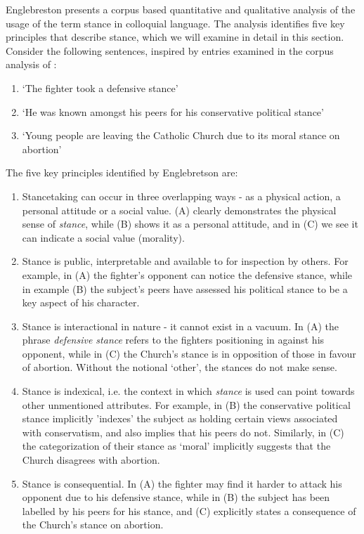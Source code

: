 \documentclass[Dissertation.tex]{subfiles}
\begin{document}
Englebreston \cite{englebretsonStancetakingDiscourseSubjectivity2007} presents a corpus based quantitative and qualitative analysis of the usage of the term stance in colloquial language. The analysis identifies five key principles that describe stance, which we will examine in detail in this section. Consider the following sentences, inspired by entries examined in the corpus analysis of \cite{englebretsonStancetakingDiscourseSubjectivity2007}:


\begin{enumerate}
	\renewcommand{\labelenumi}{(\Alph{enumi})}
	\item `The fighter took a defensive stance'
	\item `He was known amongst his peers for his conservative political stance'
	\item `Young people are leaving the Catholic Church due to its moral stance on abortion'
	\
\end{enumerate}

The five key principles identified by Englebretson \cite{englebretsonStancetakingDiscourseSubjectivity2007} are:
\begin{enumerate}
	\item Stancetaking can occur in three overlapping ways - as a physical action, a personal attitude or a social value. (A) clearly demonstrates the physical sense of \textit{stance}, while (B) shows it as a personal attitude, and in (C) we see it can indicate a social value (morality). 
	
	\item Stance is public, interpretable and available to for inspection by others. For example, in (A) the fighter's opponent can notice the defensive stance, while in example (B) the subject's peers have assessed his political stance to be a key aspect of his character.
	
	\item Stance is interactional in nature - it cannot exist in a vacuum. In (A) the  phrase \textit{defensive stance} refers to the fighters positioning in against his opponent, while in (C) the Church's stance is in opposition of those in favour of abortion. Without the notional `other', the stances do not make sense.
	
	\item Stance is indexical, i.e. the context in which \textit{stance} is used can point towards other unmentioned attributes. For example, in (B) the conservative political stance implicitly 'indexes' the subject as holding certain views  associated with conservatism, and also implies that his peers do not. Similarly, in (C) the categorization of their stance as `moral' implicitly suggests that the Church disagrees with abortion.
	
	\item Stance is consequential. In (A) the fighter may find it harder to attack his opponent due to his defensive stance, while in (B) the subject has been labelled by his peers for his stance, and (C) explicitly states a consequence of the Church's stance on abortion.
\end{enumerate}
\end{document}
